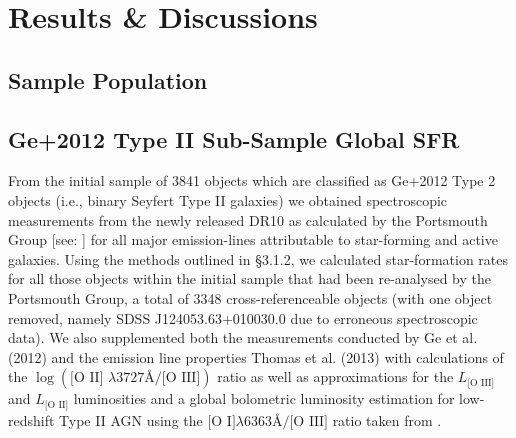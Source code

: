 \section{Results \& Discussions}
\subsection{Sample Population}
\subsection{Ge+2012 Type II Sub-Sample Global SFR}

From the initial sample of 3841 objects which are classified as Ge+2012 Type 2 objects (i.e., binary Seyfert Type II galaxies) we obtained spectroscopic measurements from the newly released DR10 as calculated by the Portsmouth Group [see: \cite{Thomas_2013}] for all major emission-lines attributable to star-forming and active galaxies. Using the methods outlined in §3.1.2, we calculated star-formation rates for all those objects within the initial sample that had been re-analysed by the Portsmouth Group, a total of 3348 cross-referenceable objects (with one object removed, namely SDSS J124053.63+010030.0 due to erroneous spectroscopic data). We also supplemented both the measurements conducted by Ge et al. (2012) and the emission line properties Thomas et al. (2013) with calculations of the $\log{(\text{[O II] }{\lambda}3727Å\text{/[O III]})}$ ratio as well as approximations for the $L_{\text{[O III]}}$ and $L_{\text{[O II]}}$ luminosities and a global bolometric luminosity estimation for low-redshift Type II AGN using the $\text{[O I]}\lambda6363Å/\text{[O III]}$ ratio taken from \cite{Netzer_2009}.         

